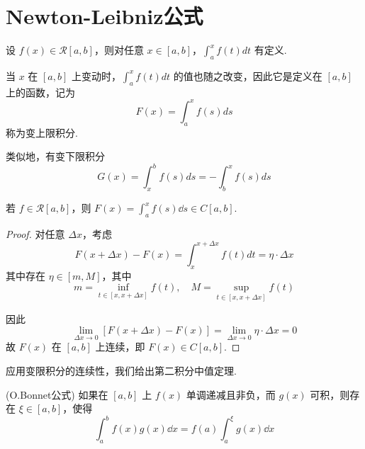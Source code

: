 \section{Newton-Leibniz公式}
\begin{definition}
	设 \( f(x) \in \mathcal{R}[a,b] \)，则对任意 \( x \in [a,b] \)，\( \displaystyle\int_a^x f(t)dt \) 有定义.
	
	当 \( x \) 在 \( [a,b] \) 上变动时，\( \displaystyle\int_a^x f(t)dt \) 的值也随之改变，因此它是定义在 \( [a,b] \) 上的函数，记为
	\[
	F(x) = \int_a^x f(s)ds
	\]
	称为变上限积分.
	
	类似地，有变下限积分
	\[
	G(x) = \int_x^b f(s)ds = -\int_b^x f(s)ds
	\]
\end{definition}
\begin{proposition}
	若 \( f \in \mathcal{R}[a,b] \)，则 \( F(x) = \displaystyle\int_a^x f(s)\dd s \in C[a,b] \).
	
	
\end{proposition}
\begin{proof}
	对任意 \( \Delta x \)，考虑
	\[
	F(x+\Delta x) - F(x) = \int_x^{x+\Delta x} f(t)dt = \eta \cdot \Delta x
	\]
	其中存在 \( \eta \in [m,M] \)，其中
	\[
	m = \inf_{t \in [x,x+\Delta x]} f(t), \quad M = \sup_{t \in [x,x+\Delta x]} f(t)
	\]
	
	因此
	\[
	\lim_{\Delta x \to 0} \left[ F(x+\Delta x) - F(x) \right] = \lim_{\Delta x \to 0} \eta \cdot \Delta x = 0
	\]
	故 \( F(x) \) 在 \( [a,b] \) 上连续，即 \( F(x) \in C[a,b] \).
\end{proof}
应用变限积分的连续性，我们给出第二积分中值定理.
\begin{lemma}(O.Bonnet公式)\label{O.Bonnet公式}
	如果在 $[a,b]$ 上 $f(x)$ 单调递减且非负，而 $g(x)$ 可积，则存在 $\xi \in [a,b]$，使得
	\[
	\int_a^b f(x)g(x) \dd x = f(a)\int_a^\xi g(x) \dd x
	\]
\end{lemma}
